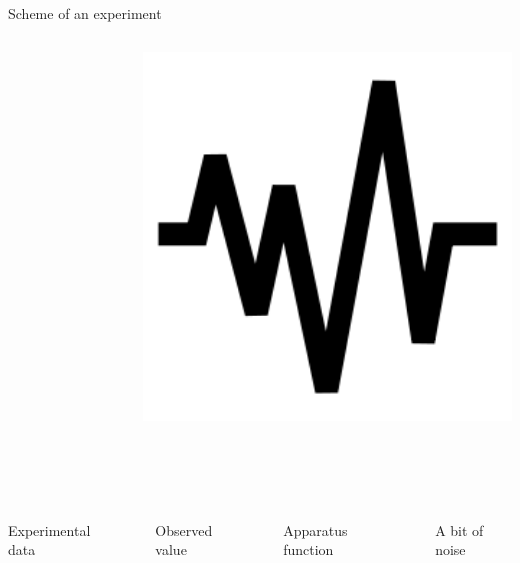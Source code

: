 \documentclass[8pt,pdf,hyperref={unicode}]{beamer}
\begin{document}
\begin{frame}
\begin{block}{Scheme of an experiment}
\begin{columns}
\begin{column}{0.05\textwidth}
        \end{column}
        \begin{column}{0.15\textwidth} 
            \includegraphics[width=1\textwidth]{image/oscillator_noise.png}\\
        \end{column}
    \end{columns}
~~~~\\~~~\\    
    \begin{columns}
        \begin{column}{0.15\textwidth}
            \LARGE{Experimental data}
        \end{column}
        \begin{column}{0.05\textwidth}
        \end{column}
        \begin{column}{0.15\textwidth}
            \LARGE{Observed value}
        \end{column}
        \begin{column}{0.05\textwidth}
        \end{column}
        \begin{column}{0.15\textwidth}
            \LARGE{Apparatus function}
        \end{column}
        \begin{column}{0.05\textwidth} 
        \end{column}
        \begin{column}{0.15\textwidth} 
            \LARGE{A bit of noise}
        \end{column}
    \end{columns}


\end{block}
\end{frame}
\end{document}
